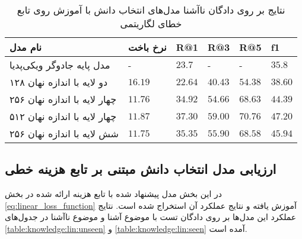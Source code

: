 \begin{table}[h]
	\caption{نتایج بر روی دادگان ناآشنا مدل‌های انتخاب دانش با آموزش روی تابع خطای لگاریتمی }
	\centering
	\label{table:knowledge:log:unseen}
	\begin{tabular}{|l|l|l|l|l|l|}
		\hline
		نام مدل                      & نرخ باخت         & R@1              & R@3              & R@5              & f1               \\ \hline
		مدل پایه جادوگر ویکی‌پدیا    & -                & $23.7$           & -                & -                & $35.8$           \\ \hline
		دو لایه با اندازه نهان ۱۲۸   & $16.19$          & $22.64$          & $40.43$          & $54.38$          & $38.60$          \\ \hline
		چهار لایه با اندازه نهان ۲۵۶ & $11.76$          & $34.92$          & $54.66$          & $68.63$          & $44.39$          \\ \hline
		چهار لایه با اندازه نهان ۵۱۲ & $11.87$          & $\mathbf{37.30}$ & $\mathbf{59.00}$ & $\mathbf{70.76}$ & $\mathbf{47.20}$ \\ \hline
		شش لایه با اندازه نهان ۲۵۶   & $\mathbf{11.75}$ & $35.35$          & $55.90$          & $68.58$          & $45.94$          \\ \hline
	\end{tabular}
\end{table}


\subsection{ارزیابی مدل انتخاب دانش مبتنی بر تابع هزینه خطی}
\label{chap5:lin_eval}

در این بخش مدل‌ پیشنهاد شده با تابع هزینه ارائه شده در بخش 
\ref{eq:linear_loss_function}
آموزش یافته و نتایج عملکرد آن استخراج شده است. نتایج عملکرد این مدل‌ها بر روی دادگان تست با موضوع آشنا و موضوع ناآشنا در جدول‌های 
\ref{table:knowledge:lin:unseen}
و 
\ref{table:knowledge:lin:seen}
آمده است.

